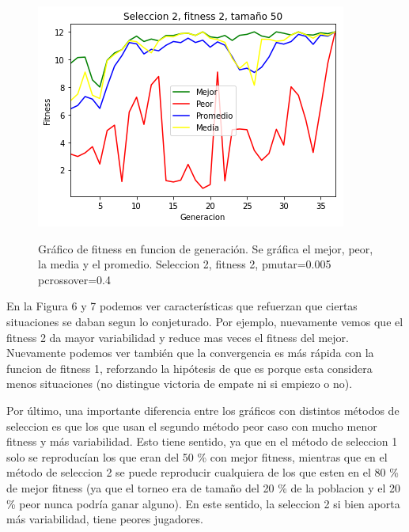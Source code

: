 \documentclass[A4paper,oneside,fleqn,11pt]{article}
\theoremstyle{definition}
\begin{document}
\begin{figure}[H]
	\captionsetup[subfigure]{position=b}
	\centering
		{\includegraphics[width=0.3\linewidth]{s2f2t50.png}}
	\caption{Gráfico de fitness en funcion de generación. Se gráfica el mejor, peor, la media y el promedio. Seleccion 2, fitness 2, pmutar=0.005 pcrossover=0.4}
\end{figure}

En la Figura 6 y 7 podemos ver características que refuerzan que ciertas situaciones se daban segun lo conjeturado. Por ejemplo, nuevamente vemos que el fitness 2 da mayor variabilidad y reduce mas veces el fitness del mejor. Nuevamente podemos ver también que la convergencia es más rápida con la funcion de fitness 1, reforzando la hipótesis de que es porque esta considera menos situaciones (no distingue victoria de empate ni si empiezo o no).

Por último, una importante diferencia entre los gráficos con distintos métodos de seleccion es que los que usan el segundo método peor caso con mucho menor fitness y más variabilidad. Esto tiene sentido, ya que en el método de seleccion 1 solo se reproducían los que eran del 50 \% con mejor fitness, mientras que en el método de seleccion 2 se puede reproducir cualquiera de los que esten en el 80  \% de mejor fitness (ya que el torneo era de tamaño del 20  \% de la poblacion y el 20  \% peor nunca podría ganar alguno). En este sentido, la seleccion 2 si bien aporta más variabilidad, tiene peores jugadores.
\end{document}
